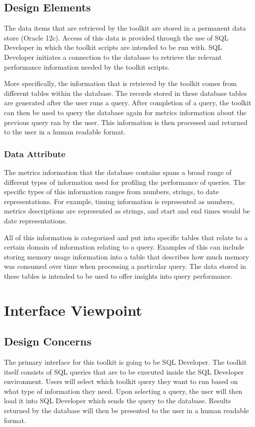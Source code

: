 \documentclass[draftclsnofoot, onecolumn, compsoc, 10pt]{IEEEtran}
\begin{document}
\subsection{Design Elements}
The data items that are retrieved by the toolkit are stored in a permanent data store (Oracle 12c).
Access of this data is provided through the use of SQL Developer in which the toolkit scripts are intended to be run with.
SQL Developer initiates a connection to the database to retrieve the relevant performance information needed by the toolkit scripts. 

More specifically, the information that is retrieved by the toolkit comes from different tables within the database.
The records stored in these database tables are generated after the user runs a query.
After completion of a query, the toolkit can then be used to query the database again for metrics information about the previous query ran by the user.
This information is then processed and returned to the user in a human readable format.

\subsubsection{Data Attribute}
The metrics information that the database contains spans a broad range of different types of information used for profiling the performance of queries.
The specific types of this information ranges from numbers, strings, to date representations.
For example, timing information is represented as numbers, metrics descriptions are represented as strings, and start and end times would be date representations.

All of this information is categorized and put into specific tables that relate to a certain domain of information relating to a query.
Examples of this can include storing memory usage information into a table that describes how much memory was consumed over time when processing a particular query.
The data stored in these tables is intended to be used to offer insights into query performance.

\section{Interface Viewpoint}
\subsection{Design Concerns}
The primary interface for this toolkit is going to be SQL Developer. 
The toolkit itself consists of SQL queries that are to be executed inside the SQL Developer environment.
Users will select which toolkit query they want to run based on what type of information they need. Upon selecting a query, the user will then load it into SQL Developer which sends the query to the database.
Results returned by the database will then be presented to the user in a human readable format.
\end{document}
